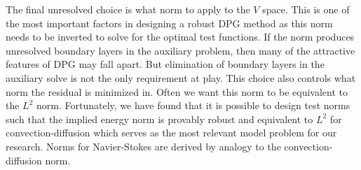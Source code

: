 \documentclass[preprint,12pt]{elsarticle}
\begin{document}
The final unresolved choice is what norm to apply to the $V$ space.
This is one of the most important factors in designing a robust DPG method as this norm needs to be inverted to solve for the optimal test functions.
If the norm produces unresolved boundary layers in the auxiliary problem, then many of the attractive features of DPG may fall apart.
But elimination of boundary layers in the auxiliary solve is not the only requirement at play. 
This choice also controls what norm the residual is minimized in. 
Often we want this norm to be equivalent to the $L^2$ norm.
Fortunately, we have found that it is possible to design test norms such that the implied energy norm 
is provably robust and equivalent to $L^2$ for convection-diffusion which
serves as the most relevant model problem for our research.
Norms for Navier-Stokes are derived by analogy to the convection-diffusion norm.



%                                
%                                
%   
\end{document}
